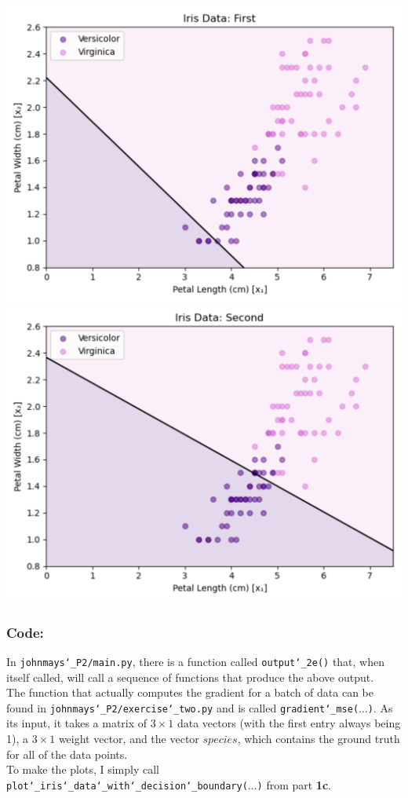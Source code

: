 \documentclass{article} %
\newcommand{\us}{\char`_}
\begin{document}
\begin{center}
    \includegraphics[scale = 0.32]{2e_plot_1.png}\includegraphics[scale = 0.32]{2e_plot_2.png}
\end{center}
\subsubsection*{Code:}
In \texttt{johnmays\us P2/main.py}, there is a function called \texttt{output\us 2e()} that, when itself called, will call a sequence of functions that produce the above output.\\
\linebreak
The function that actually computes the gradient for a batch of data can be found in \texttt{johnmays\us P2/exercise\us two.py} and is called \texttt{gradient\us mse($\hdots$)}.  As its input, it takes a matrix of $3\times 1$ data vectors (with the first entry always being 1), a $3\times 1$ weight vector, and the vector $species$, which contains the ground truth for all of the data points.\\
\linebreak
To make the plots, I simply call \texttt{plot\us iris\us data\us with\us decision\us boundary($\hdots$)} from part \textbf{1c}. 
\pagebreak
\end{document}
